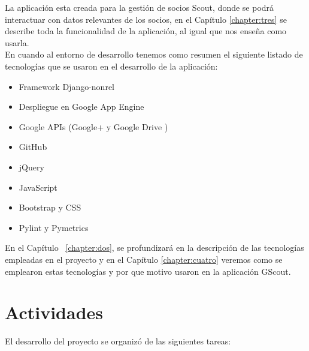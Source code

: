 La aplicación esta creada para la gestión de socios Scout, donde se podrá interactuar con datos relevantes de los socios, en el Capítulo \ref{chapter:tres}
se describe toda la funcionalidad de la aplicación, al igual que nos enseña como usarla.\\

En cuando al entorno de desarrollo tenemos como resumen el siguiente listado de tecnologías que se usaron en el desarrollo de la aplicación:\\

\begin{itemize}
  \item Framework Django-nonrel \cite{URL:DjangoNonrel}
  \item Despliegue en Google App Engine \cite{URL:GAE}
  \item Google APIs (Google+ \cite{URL:GooglePlus} y Google Drive \cite{URL:GoogleDrive}) 
  \item GitHub \cite{URL:GitHub}
  \item jQuery \cite{URL:jQuery}
  \item JavaScript \cite{URL:JavaScript}
  \item Bootstrap \cite{URL:Bootstrap} y CSS \cite{URL:CSS}
  \item Pylint \cite{URL:Pylint} y Pymetrics \cite{URL:Pymetrics}
  
\end{itemize}
En el Capítulo ~\ref{chapter:dos}, se profundizará en la descripción de las tecnologías empleadas en el proyecto y en el Capítulo \ref{chapter:cuatro} 
veremos como se emplearon estas tecnologías y por que motivo usaron en la aplicación GScout.\\

\section{Actividades}
\label{1:sec:3}
El desarrollo del proyecto se organizó de las siguientes tareas:


